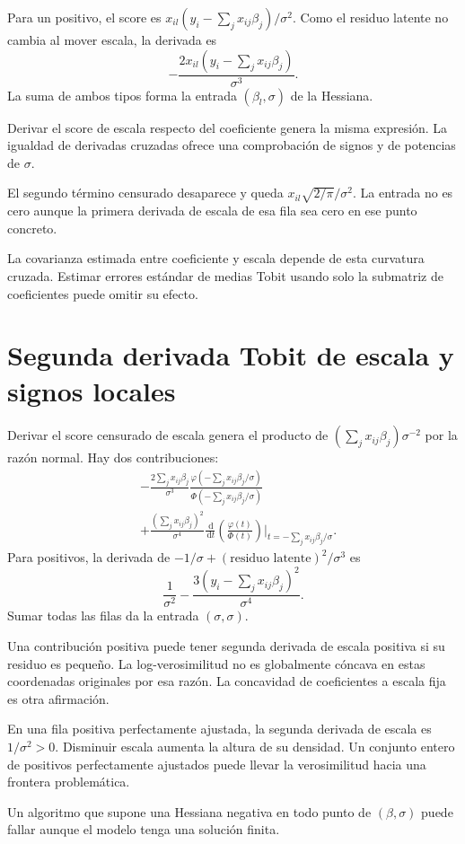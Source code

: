 \documentclass[11pt,a4paper]{article}
\newcommand{\dd}{\,\mathrm d}
\begin{document}
Para un positivo, el score
es \(x_{il}(y_i-\sum_jx_{ij}\beta_j)/\sigma^2\).
Como el residuo latente
no cambia al mover escala,
la derivada es
\[
-\frac{2x_{il}(y_i-\sum_jx_{ij}\beta_j)}{\sigma^3}.
\]
La suma de ambos tipos
forma la entrada \((\beta_l,\sigma)\)
de la Hessiana.

Derivar el score de escala
respecto del coeficiente genera
la misma expresión.
La igualdad de derivadas cruzadas
ofrece una comprobación de signos
y de potencias de \(\sigma\).

\begin{ejemplo}
El segundo término censurado
desaparece y queda
\(x_{il}\sqrt{2/\pi}/\sigma^2\).
La entrada no es cero
aunque la primera derivada
de escala de esa fila sea cero
en ese punto concreto.
\end{ejemplo}
La covarianza estimada entre
coeficiente y escala depende
de esta curvatura cruzada.
Estimar errores estándar de
medias Tobit usando solo
la submatriz de coeficientes
puede omitir su efecto.

\clearpage
\section{Segunda derivada Tobit de escala y signos locales}\label{unidad97}
Derivar el score censurado de escala
genera el producto de
\((\sum_jx_{ij}\beta_j)\sigma^{-2}\)
por la razón normal.
Hay dos contribuciones:
\[
\begin{aligned}
&-\frac{2\sum_jx_{ij}\beta_j}{\sigma^3}
\frac{\varphi(-\sum_jx_{ij}\beta_j/\sigma)}
{\Phi(-\sum_jx_{ij}\beta_j/\sigma)}\\
&+\frac{(\sum_jx_{ij}\beta_j)^2}{\sigma^4}
\frac{\dd}{\dd t}
\left(\frac{\varphi(t)}{\Phi(t)}\right)
\bigg|_{t=-\sum_jx_{ij}\beta_j/\sigma}.
\end{aligned}
\]
Para positivos, la derivada de
\(-1/\sigma+(\text{residuo latente})^2/\sigma^3\)
es
\[
\frac1{\sigma^2}
-\frac{3(y_i-\sum_jx_{ij}\beta_j)^2}{\sigma^4}.
\]
Sumar todas las filas
da la entrada \((\sigma,\sigma)\).

Una contribución positiva puede
tener segunda derivada de escala
positiva si su residuo es pequeño.
La log-verosimilitud no es
globalmente cóncava en estas
coordenadas originales por esa razón.
La concavidad de coeficientes
a escala fija es otra afirmación.

\begin{ejemplo}
En una fila positiva perfectamente ajustada,
la segunda derivada de escala
es \(1/\sigma^2>0\).
Disminuir escala aumenta la
altura de su densidad.
Un conjunto entero de positivos
perfectamente ajustados puede
llevar la verosimilitud hacia
una frontera problemática.
\end{ejemplo}
Un algoritmo que supone una
Hessiana negativa en todo
punto de \((\beta,\sigma)\)
puede fallar aunque el
modelo tenga una solución finita.
\end{document}
